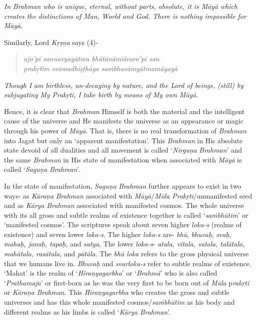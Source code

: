 \emph{In Brahman who is unique, eternal, without parts, absolute, it is Māyā which creates the distinctions of Man, World and God. There is nothing impossible for Māyā}.

Similarly, Lord \emph{Kṛṣṇa} says (4)-
\vskip -10pt

\begin{verse}
\emph{ajo'pi sannavyayātma bhūtānāmīśvaro'pi san }\\
\emph{prakṛtim svāmadhiṣṭhāya saṁbhavāmyātmamāyayā }
\end{verse}
\vskip -10pt

\emph{Though I am birthless, un-decaying by nature, and the Lord of beings, (still) by subjugating My Prakṛti, I take birth by means of My own Māyā.}

Hence, it is clear that \emph{Brahman} Himself is both the material and the intelligent cause of the universe and He manifests the universe as an appearance or magic through his power of \emph{Māyā}. That is, there is no real transformation of \emph{Brahman} into Jagat but only an `apparent manifestation'. This \emph{Brahman} in His absolute state devoid of all dualities and all movement is called `\emph{Nirguṇa} \emph{Brahman}' and the same \emph{Brahman} in His state of manifestation when associated with \emph{Māyā} is called `\emph{Saguṇa} \emph{Brahman}'.

In the state of manifestation, \emph{Saguṇa} \emph{Brahman} further appears to exist in two ways- as \emph{Kāraṇa} \emph{Brahman} associated with \emph{Māyā}/\emph{Mūla} \emph{Prakṛti}/unmanifested seed and as \emph{Kārya Brahman} associated with manifested cosmos. The whole universe with its all gross and subtle realms of existence together is called `\emph{saṁbhūtim}' or `manifested cosmos'. The scriptures speak about seven higher \emph{loka-s} (realms of existence) and seven lower \emph{loka-s}. The higher \emph{loka-s} are- \emph{bhū}, \emph{bhuvaḥ}, \emph{svaḥ}, \emph{mahaḥ, janaḥ, tapaḥ,} and \emph{satya}. The lower \emph{loka-s}- \emph{atala, vitala, sutala, talātala, mahātala, rasātala,} and \emph{pātāla}. The \emph{bhū loka} refers to the gross physical universe that we humans live in. \emph{Bhuvaḥ} and \emph{svarloka-s} refer to subtle realms of existence. `Mahat' is the realm of `\emph{Hiraṇyagarbha}' or `\emph{Brahmā}' who is also called `\emph{Prathamaja}' or first-born as he was the very first to be born out of \emph{Mūla} p\emph{rakṛti} or \emph{Kāraṇa} \emph{Brahman}. This \emph{Hiraṇyagarbha} who creates the gross and subtle universes and has this whole manifested cosmos/\emph{saṁbhūtim} as his body and different realms as his limbs is called `\emph{Kārya} \emph{Brahman}'.

